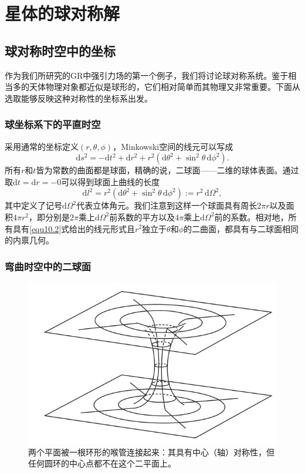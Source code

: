 \chapter{星体的球对称解}
\label{chap10}

\section{球对称时空中的坐标}\label{sec10.1}
作为我们所研究的GR中强引力场的第一个例子，我们将讨论球对称系统。鉴于相当多的天体物理对象都近似是球形的，它们相对简单而其物理又非常重要。下面从选取能够反映这种对称性的坐标系出发。

\subsection*{球坐标系下的平直时空}
采用通常的坐标定义$(r,\theta,\phi)$，Minkowski空间的线元可以写成
\begin{equation}
\mathrm ds^2=-\mathrm dt^2+\mathrm dr^2+r^2(\mathrm d\theta^2+\sin^2\theta\,\mathrm d\phi^2).
\end{equation}
所有$r$和$t$皆为常数的曲面都是球面，精确的说，二球面——二维的球体表面。通过取$\mathrm dt=\mathrm dr=-0$可以得到球面上曲线的长度
\begin{equation}
\mathrm dl^2 = r^2(\mathrm d\theta^2+\sin^2\theta\,\mathrm d\phi^2):=r^2\,\mathrm d\Omega^2,
\label{equ10.2}
\end{equation}
其中定义了记号$\mathrm d\Omega^2$代表立体角元。我们注意到这样一个球面具有周长$2\pi r$以及面积$4\pi r^2$，即分别是$2\pi$乘上$\mathrm d\Omega^2$前系数的平方以及$4\pi$乘上$\mathrm d\Omega^2$前的系数。相对地，所有具有\eqref{equ10.2}式给出的线元形式且$r^2$独立于$\theta$和$\phi$的二曲面，都具有与二球面相同的内禀几何。

\subsection*{弯曲时空中的二球面}

\begin{figure}
\centering
\includegraphics[width=.4\textwidth]{Pictures/fig10.1.png}
\caption{两个平面被一根环形的喉管连接起来：其具有中心（轴）对称性，但任何圆环的中心点都不在这个二平面上。}
\label{fig10.1}
\end{figure}

